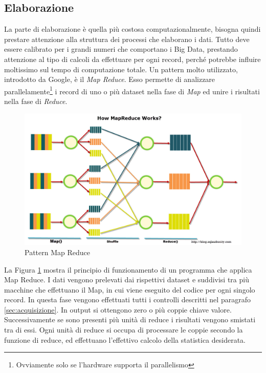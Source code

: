 \subsection{Elaborazione}\label{sec:elaborazione}
La parte di elaborazione è quella più costosa computazionalmente, bisogna quindi prestare attenzione alla struttura dei processi che elaborano i dati. Tutto deve essere calibrato per i grandi numeri che comportano i Big Data, prestando attenzione al tipo di calcoli da effettuare per ogni record, perché potrebbe influire moltissimo sul tempo di computazione totale. Un pattern molto utilizzato, introdotto da Google, è il \emph{Map Reduce}. \label{sec:mapreduce}
Esso permette di analizzare parallelamente\footnote{Ovviamente solo se l'hardware supporta il parallelismo} i record di uno o più dataset nella fase di \emph{Map} ed unire i risultati nella fase di \emph{Reduce}.
\begin{figure}[ht!]
	\caption{Pattern Map Reduce}
	\label{img:mapreduce}
	\centering
		\includegraphics[width=\textwidth]{img/mapreduce.jpg}
\end{figure}
La Figura \ref{img:mapreduce} mostra il principio di funzionamento di un programma che applica Map Reduce. I dati vengono prelevati dai rispettivi dataset e suddivisi tra più macchine che effettuano il Map, in cui viene eseguito del codice per ogni singolo record. In questa fase vengono effettuati tutti i controlli descritti nel paragrafo \ref{sec:acquisizione}. In output si ottengono zero o più coppie chiave valore. Successivamente se sono presenti più unità di reduce i risultati vengono smistati tra di essi. Ogni unità di reduce si occupa di processare le coppie secondo la funzione di reduce, ed effettuano l'effettivo calcolo della statistica desiderata.



